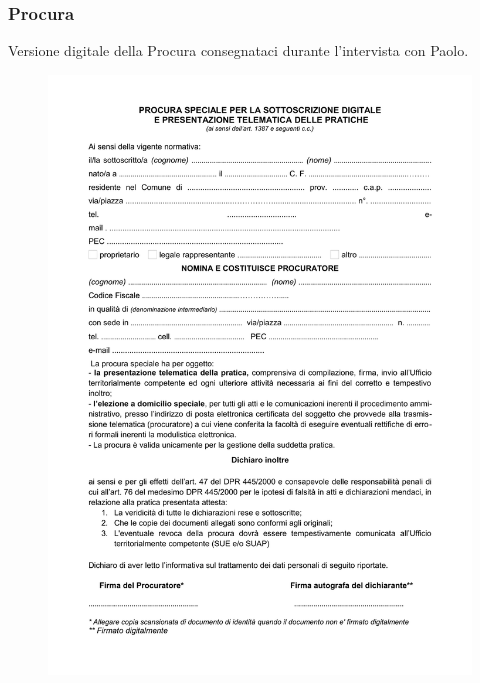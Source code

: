 \documentclass{elegantbook}
\begin{document}
	\subsubsection{Procura}
	Versione digitale della Procura consegnataci durante l'intervista con Paolo.
		\begin{figure}[H]
			\centering
			\includegraphics[scale=0.8]{../Img/Documents/Procura/Procura-1.png}
		\end{figure}
\end{document}
